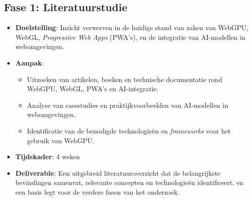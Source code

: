 



\subsection*{Fase 1: Literatuurstudie}
\begin{itemize}
  \item \textbf{Doelstelling}: Inzicht verwerven in de huidige stand van zaken van WebGPU, WebGL, \textit{Progressive Web Apps} (PWA's), en de integratie van AI-modellen in webomgevingen.

  \item \textbf{Aanpak}:
  \begin{itemize}
    \item Uitzoeken van artikelen, boeken en technische documentatie rond WebGPU, WebGL, PWA's en AI-integratie.
    \item Analyse van casestudies en praktijkvoorbeelden van AI-modellen in webomgevingen.
    \item Identificatie van de benodigde technologieën en \textit{frameworks} voor het gebruik van WebGPU.
  \end{itemize}

  \item \textbf{Tijdskader}: 4 weken
  \item \textbf{Deliverable}: Een uitgebreid literatuuroverzicht dat de belangrijkste bevindingen samenvat, relevante concepten en technologieën identificeert, en een basis legt voor de verdere fasen van het onderzoek.
\end{itemize}

